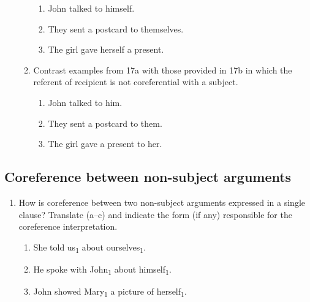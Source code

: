 \documentclass[output=paper]{langscibook}
\begin{document}
\begin{enumerate}[resume]
\begin{enumerate}[label=(\alph*)]
    \begin{enumerate}[label=\alph*.]
    \item John talked to himself. 
    \item They sent a postcard to themselves. 
    \item The girl gave herself a present.
    \end{enumerate}

    \item Contrast examples from {17a} with those provided in {17b} in which the referent of recipient is not coreferential with a subject.

    \begin{enumerate}[label=\alph*.]
      \item John talked to him. 
      \item They sent a postcard to them. 
      \item The girl gave a present to her. 
    \end{enumerate}
  \end{enumerate}
\end{enumerate}


\subsection*{Coreference between non-subject arguments}
\begin{enumerate}[resume]
\item How is coreference between two non-subject arguments expressed in a single clause? Translate (a--c) and indicate the form (if any) responsible for the coreference interpretation. 

\begin{enumerate}[label=\alph*.]
\item She told us\textsubscript{1} about ourselves\textsubscript{1}. 
\item He spoke with John\textsubscript{1} about himself\textsubscript{1}. 
\item John showed Mary\textsubscript{1} a picture of herself\textsubscript{1}. 
\end{enumerate}
\end{enumerate}
\end{document}

